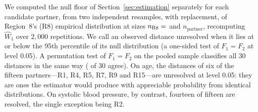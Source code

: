 \documentclass[AMA,Times1COL]{WileyNJDv5}
\begin{document}
We computed the null floor of Section~\ref{sec:estimation} separately for each candidate partner, from two independent resamples, with replacement, of Region~8's (R8) empirical distribution at sizes $n_{\text{R8}} = \numval{nR8floor}$ and $n_{\text{partner}}$, recomputing $\widehat{W}_1$ over $2{,}000$ repetitions. We call an observed distance unresolved when it lies at or below the 95th percentile of its null distribution (a one-sided test of $F_1 = F_2$ at level 0.05). A permutation test of $F_1 = F_2$ on the pooled sample classifies all 30 distances in the same way ( of 30 agree). On age, the distances of six of the fifteen partners---R1, R4, R5, R7, R9 and R15---are unresolved at level 0.05: they are ones the estimator would produce with appreciable probability from identical distributions. On systolic blood pressure, by contrast, fourteen of fifteen are resolved, the single exception being R2.

\end{document}
